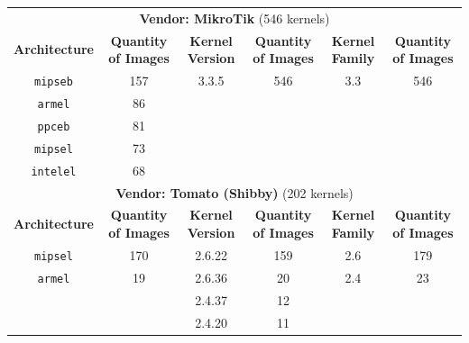 \begin{table}[H]
{\begin{tabular}{cccccc}
\multicolumn{6}{c}{\textbf{Vendor: MikroTik} (546 kernels)}                                                                    \\
\textbf{Architecture}  &  \multicolumn{1}{c|}{\textbf{Quantity of Images}} & \textbf{Kernel Version} & \multicolumn{1}{c|}{\textbf{Quantity of Images}} & \textbf{Kernel Family} & \textbf{Quantity of Images} \\ \hline
{\tt mipseb}            & \multicolumn{1}{c|}{157}                & 3.3.5                  & \multicolumn{1}{c|}{546}                           & 3.3                     & 546                       \\
{\tt armel}             & \multicolumn{1}{c|}{86}                 &                        & \multicolumn{1}{c|}{}                              &                         &                           \\
{\tt ppceb}             & \multicolumn{1}{c|}{81}                 &                        & \multicolumn{1}{c|}{}                              &                         &                           \\ 
{\tt mipsel}            & \multicolumn{1}{c|}{73}                 &                        & \multicolumn{1}{c|}{}                              &                         &                           \\ 
{\tt intelel}           & \multicolumn{1}{c|}{68}                 &                        & \multicolumn{1}{c|}{}                              &                         &                           \\ \hline

\multicolumn{6}{c}{\textbf{Vendor: Tomato (Shibby)} (202 kernels)}                                                                    \\
\textbf{Architecture} & \multicolumn{1}{c|}{\textbf{Quantity of Images}} & \textbf{Kernel Version} & \multicolumn{1}{c|}{\textbf{Quantity of Images}} & \textbf{Kernel Family} & \textbf{Quantity of Images} \\ \hline
{\tt mipsel}            & \multicolumn{1}{c|}{170}               & 2.6.22                  & \multicolumn{1}{c|}{159}                         & 2.6                     & 179                        \\
{\tt armel}             & \multicolumn{1}{c|}{19}                & 2.6.36                  & \multicolumn{1}{c|}{20}                          & 2.4                     & 23                         \\
                        & \multicolumn{1}{c|}{}                  & 2.4.37                  & \multicolumn{1}{c|}{12}                          &                         &                            \\
                        & \multicolumn{1}{c|}{}                  & 2.4.20                  & \multicolumn{1}{c|}{11}                          &                         &                            \\ \hline


\end{tabular}}
\end{table}
